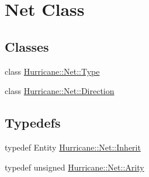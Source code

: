 \hypertarget{group__NetClass}{\section{Net Class}
\label{group__NetClass}
}
\subsection*{Classes}
\begin{DoxyCompactItemize}
\item 
class \hyperlink{classHurricane_1_1Net_1_1Type}{Hurricane\-::\-Net\-::\-Type}
\item 
class \hyperlink{classHurricane_1_1Net_1_1Direction}{Hurricane\-::\-Net\-::\-Direction}
\end{DoxyCompactItemize}
\subsection*{Typedefs}
\begin{DoxyCompactItemize}
\item 
typedef Entity \hyperlink{group__NetClass_ga3f1ac0fcb03638b2ffa9af6a9a58de15}{Hurricane\-::\-Net\-::\-Inherit}
\item 
typedef unsigned \hyperlink{group__NetClass_ga3a242d929e0c733f90f3f69be8cc427b}{Hurricane\-::\-Net\-::\-Arity}
\end{DoxyCompactItemize}
